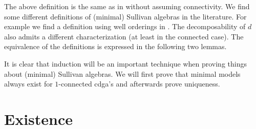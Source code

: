The above definition is the same as in \cite{felix} without assuming connectivity. We find some different definitions of (minimal) Sullivan algebras in the literature. For example we find a definition using well orderings in \cite{hess}. The decomposability of $d$ also admits a different characterization (at least in the connected case). The equivalence of the definitions is expressed in the following two lemmas.



It is clear that induction will be an important technique when proving things about (minimal) Sullivan algebras. We will first prove that minimal models always exist for $1$-connected cdga's and afterwards prove uniqueness.


\section{Existence}


